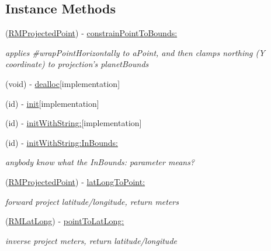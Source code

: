 \subsection*{Instance Methods}
\begin{DoxyCompactItemize}
\item 
(\hyperlink{struct_r_m_projected_point}{R\-M\-Projected\-Point}) -\/ \hyperlink{interface_r_m_projection_a46f6e09a03a1383d82b3ef347db52f12}{constrain\-Point\-To\-Bounds\-:}
\begin{DoxyCompactList}\small\item\em applies \#wrap\-Point\-Horizontally to a\-Point, and then clamps northing (Y coordinate) to projection's planet\-Bounds \end{DoxyCompactList}\item 
(void) -\/ \hyperlink{interface_r_m_projection_a6502b343dac3ea98da4cff9ba3298feb}{dealloc}{\ttfamily  \mbox{[}implementation\mbox{]}}
\item 
(id) -\/ \hyperlink{interface_r_m_projection_abd5003857d513518eea0cd6760f54ccd}{init}{\ttfamily  \mbox{[}implementation\mbox{]}}
\item 
(id) -\/ \hyperlink{interface_r_m_projection_a7295b2382970d7dfe8d62112062d9268}{init\-With\-String\-:}{\ttfamily  \mbox{[}implementation\mbox{]}}
\item 
(id) -\/ \hyperlink{interface_r_m_projection_a3cb82d1e81597dd3a3039168d0be8d9c}{init\-With\-String\-:\-In\-Bounds\-:}
\begin{DoxyCompactList}\small\item\em anybody know what the In\-Bounds\-: parameter means? \end{DoxyCompactList}\item 
(\hyperlink{struct_r_m_projected_point}{R\-M\-Projected\-Point}) -\/ \hyperlink{interface_r_m_projection_a857345e06858eef53abc8f464cb0f0f3}{lat\-Long\-To\-Point\-:}
\begin{DoxyCompactList}\small\item\em forward project latitude/longitude, return meters \end{DoxyCompactList}\item 
(\hyperlink{struct_r_m_lat_long}{R\-M\-Lat\-Long}) -\/ \hyperlink{interface_r_m_projection_a85564cbd0ad54533588ddb55068c4b99}{point\-To\-Lat\-Long\-:}
\begin{DoxyCompactList}\small\item\em inverse project meters, return latitude/longitude \end{DoxyCompactList}\item 

\end{DoxyCompactItemize}
